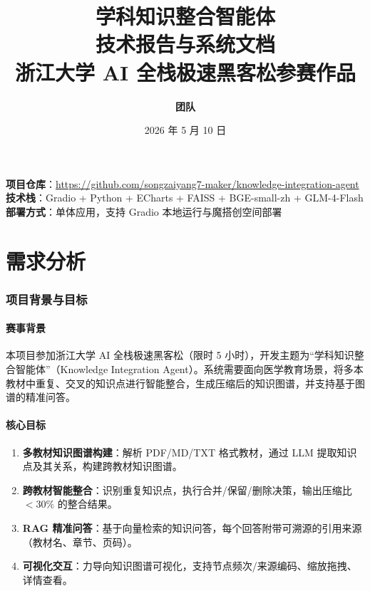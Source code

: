\documentclass[12pt,a4paper]{article}
\title{
    \vspace{-1cm}
    {\LARGE\bfseries 学科知识整合智能体} \\[6pt]
    {\Large\bfseries 技术报告与系统文档} \\[12pt]
    {\large 浙江大学 AI 全栈极速黑客松参赛作品}
}
\author{
    \textbf{团队} \\[4pt]
}
\date{2026 年 5 月 10 日}
\begin{document}
\maketitle
\thispagestyle{fancy}

\begin{center}
\begin{tcolorbox}[colback=gray!5, colframe=gray!40, width=0.85\textwidth, arc=2mm]
\centering
\textbf{项目仓库}：\url{https://github.com/songzaiyang7-maker/knowledge-integration-agent} \\[4pt]
\textbf{技术栈}：Gradio + Python + ECharts + FAISS + BGE-small-zh + GLM-4-Flash \\[4pt]
\textbf{部署方式}：单体应用，支持 Gradio 本地运行与魔搭创空间部署
\end{tcolorbox}
\end{center}

\vspace{0.5cm}

\tableofcontents
\newpage

\part{需求分析}

\section{项目背景与目标}
\label{sec:background}

\subsection{赛事背景}

本项目参加浙江大学 AI 全栈极速黑客松（限时 5 小时），开发主题为``学科知识整合智能体''（Knowledge Integration Agent）。系统需要面向医学教育场景，将多本教材中重复、交叉的知识点进行智能整合，生成压缩后的知识图谱，并支持基于图谱的精准问答。

\subsection{核心目标}

\begin{enumerate}[leftmargin=2em]
    \item \textbf{多教材知识图谱构建}：解析 PDF/MD/TXT 格式教材，通过 LLM 提取知识点及其关系，构建跨教材知识图谱。
    \item \textbf{跨教材智能整合}：识别重复知识点，执行合并/保留/删除决策，输出压缩比 $< 30\%$ 的整合结果。
    \item \textbf{RAG 精准问答}：基于向量检索的知识问答，每个回答附带可溯源的引用来源（教材名、章节、页码）。
    \item \textbf{可视化交互}：力导向知识图谱可视化，支持节点频次/来源编码、缩放拖拽、详情查看。
\end{enumerate}
\end{document}
